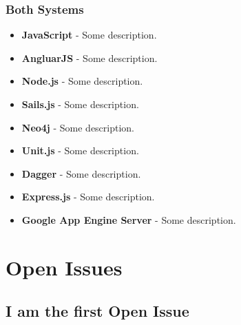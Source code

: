 \documentclass[11pt,fleqn]{book} %
\begin{document}
		\subsection{Both Systems}
			\begin{itemize}
				\item\textbf{JavaScript} -
				Some description.
				
				\item\textbf{AngluarJS} -
				Some description.
				
				\item\textbf{Node.js} -
				Some description.
				
				\item\textbf{Sails.js} -
				Some description.
				
				\item\textbf{Neo4j} -
				Some description.
				
				\item\textbf{Unit.js} -
				Some description.
				
				\item\textbf{Dagger} -
				Some description.
				
				\item\textbf{Express.js} -
				Some description.
				
				\item\textbf{Google App Engine Server} -
				Some description.			
			\end{itemize}	
	


\chapter{Open Issues}

\section{I am the first Open Issue}
\end{document}
